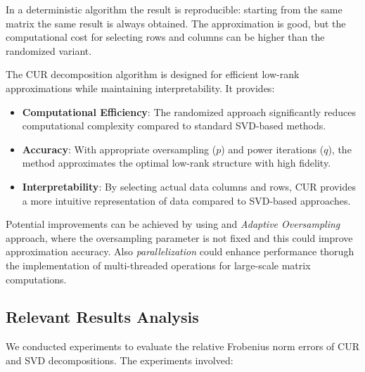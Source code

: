 \documentclass[11pt,a4paper]{article}
\begin{document}
In a deterministic algorithm the result is reproducible: starting from the same matrix the same result is always obtained. The approximation is good, but the computational cost for selecting rows and columns can be higher than the randomized variant.

The CUR decomposition algorithm is designed for efficient low-rank approximations while maintaining interpretability. It provides:
\begin{itemize}
\item \textbf{Computational Efficiency}: The randomized approach significantly reduces computational complexity compared to standard SVD-based methods.
\item \textbf{Accuracy}: With appropriate oversampling ($ p $) and power iterations ($ q $), the method approximates the optimal low-rank structure with high fidelity.
\item \textbf{Interpretability}: By selecting actual data columns and rows, CUR provides a more intuitive representation of data compared to SVD-based approaches.
\end{itemize}


Potential improvements can be achieved by using and \textit{Adaptive Oversampling} approach, where the oversampling parameter is not fixed and this could improve approximation accuracy. Also \textit{parallelization} could enhance performance thorugh the implementation of multi-threaded operations for large-scale matrix computations.



\subsection{Relevant Results Analysis}
We conducted experiments to evaluate the relative Frobenius norm errors of CUR and SVD decompositions. The experiments involved: 
\end{document}
